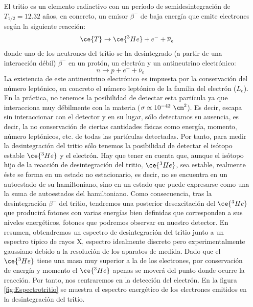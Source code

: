 El tritio es  un elemento radiactivo con un período de semidesintegración de $T_{1/2}=12.32$ años, en concreto, un emisor $\beta^-$ de baja energía que emite electrones según la siguiente reacción:
\begin{equation}
\ce{T} \rightarrow \ce{^{3}He} + e^- + \overline{\nu}_e
\label{desintegraciontritio}
\end{equation}
donde  uno de los neutrones del tritio se ha desintegrado (a partir de una interacción débil)  $\beta^-$ en un protón, un electrón y un antineutrino electrónico:
\begin{equation}
n \rightarrow p + e^- + \overline{\nu}_e \qquad 
\label{desintegracionbeta}
\end{equation}
La existencia de este antineutrino electrónico es impuesta por la conservación del número leptónico, en concreto el número leptónico de la familia del electrón ($L_e$). En la práctica, no tenemos la posibilidad de detectar esta partícula ya que interacciona muy débilmente con la materia ($\sigma \propto 10^{-42}~\cm^2$).  Es decir, escapa sin interaccionar con el detector y en su lugar, sólo detectamos su ausencia, es decir, la no conservación de ciertas cantidades físicas como energía, momento, número leptónicos, etc. de todas  las partículas detectadas.
Por tanto, para medir la desintegración del tritio sólo tenemos la posibilidad de detectar el isótopo estable $\ce{^3He}$  y el electrón. Hay que tener en cuenta que, aunque el isótopo hijo de la reacción de desintegración del tritio, $\ce{^3He}$, sea estable, realmente éste se forma en un estado no estacionario, es decir, no se encuentra en un autoestado de su hamiltoniano, sino en un estado que puede expresarse como una la suma de autoestados del hamiltoniano. Como consecuencia, tras la desintegración $\beta^-$ del tritio, tendremos una posterior desexcitación del $\ce{^3He}$ que producirá fotones con varias energías bien definidas que corresponden a sus niveles energéticos, fotones que podremos observar en nuestro detector. En resumen, obtendremos un espectro de desintegración del tritio junto a un espectro típico de rayos X, espectro idealmente discreto pero experimentalmente gaussiano debido a la resolución  de los aparatos de medida.
Dado que el $\ce{^3He}$  tiene una masa muy superior a la de los electrones, por conservación de energía y momento el $\ce{^3He}$  apenas se moverá del punto donde ocurre la reacción. Por tanto, nos centraremos en la detección del electrón. En la figura\,\ref{fig:Espectrotritio} se muestra el espectro energético de los electrones emitidos en la desintegración del tritio.
